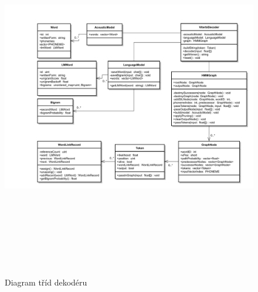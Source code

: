 \begin{figure}[H]\label{app:decoder}
	\centering
		\includegraphics[height=16cm, angle=90]{obrazky-figures/classdiagram_decoder.pdf}
        \caption{Diagram tříd dekodéru}
\end{figure}
